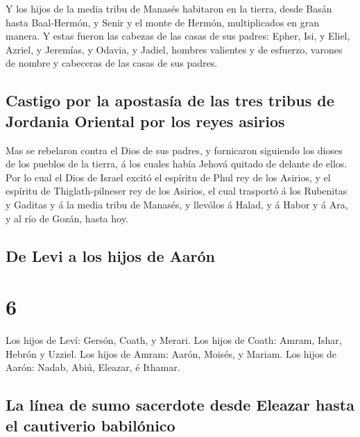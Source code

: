  Y los hijos de la media tribu de Manasés habitaron en la
tierra, desde Basán hasta Baal-Hermón, y Senir y el monte de Hermón,
multiplicados en gran manera.  Y estas fueron las cabezas
de las casas de sus padres: Epher, Isi, y Eliel, Azriel, y Jeremías, y
Odavia, y Jadiel, hombres valientes y de esfuerzo, varones de nombre y
cabeceras de las casas de sus padres.

\hypertarget{castigo-por-la-apostasuxeda-de-las-tres-tribus-de-jordania-oriental-por-los-reyes-asirios}{%
\subsection{Castigo por la apostasía de las tres tribus de Jordania
Oriental por los reyes
asirios}\label{castigo-por-la-apostasuxeda-de-las-tres-tribus-de-jordania-oriental-por-los-reyes-asirios}}

 Mas se rebelaron contra el Dios de sus padres, y
fornicaron siguiendo los dioses de los pueblos de la tierra, á los
cuales había Jehová quitado de delante de ellos.  Por lo
cual el Dios de Israel excitó el espíritu de Phul rey de los Asirios, y
el espíritu de Thiglath-pilneser rey de los Asirios, el cual trasportó á
los Rubenitas y Gaditas y á la media tribu de Manasés, y llevólos á
Halad, y á Habor y á Ara, y al río de Gozán, hasta hoy.

\hypertarget{de-levi-a-los-hijos-de-aaruxf3n}{%
\subsection{De Levi a los hijos de
Aarón}\label{de-levi-a-los-hijos-de-aaruxf3n}}

\hypertarget{section-13-6}{%
\section{6}\label{section-13-6}}

 Los hijos de Leví: Gersón, Coath, y Merari.
 Los hijos de Coath: Amram, Ishar, Hebrón y Uzziel.
 Los hijos de Amram: Aarón, Moisés, y Mariam. Los hijos de
Aarón: Nadab, Abiú, Eleazar, é Ithamar.

\hypertarget{la-luxednea-de-sumo-sacerdote-desde-eleazar-hasta-el-cautiverio-babiluxf3nico}{%
\subsection{La línea de sumo sacerdote desde Eleazar hasta el cautiverio
babilónico}\label{la-luxednea-de-sumo-sacerdote-desde-eleazar-hasta-el-cautiverio-babiluxf3nico}}

